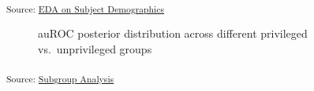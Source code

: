 \documentclass[
  letterpaper,
  DIV=11,
  numbers=noendperiod]{scrartcl}
\begin{document}
\textsubscript{Source:
\href{https://jjcurtin.github.io/study_messages/notebooks/fig_demographics-preview.html\#cell-fig-demographics}{EDA
on Subject Demographics}}

\begin{figure}[H]


\caption{\label{fig-fairness}auROC posterior distribution across
different privileged vs.~unprivileged groups}

\end{figure}%

\textsubscript{Source:
\href{https://jjcurtin.github.io/study_messages/notebooks/fig_fairness-preview.html\#cell-fig-fairness}{Subgroup
Analysis}}
\end{document}
